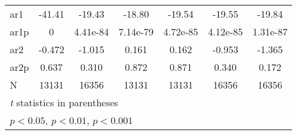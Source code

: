 \begin{table}[htbp]
\begin{tabular}{l*{6}{c}}
ar1                 &      -41.41         &      -19.43         &      -18.80         &      -19.54         &      -19.55         &      -19.84         \\
ar1p                &           0         &    4.41e-84         &    7.14e-79         &    4.72e-85         &    4.12e-85         &    1.31e-87         \\
ar2                 &      -0.472         &      -1.015         &       0.161         &       0.162         &      -0.953         &      -1.365         \\
ar2p                &       0.637         &       0.310         &       0.872         &       0.871         &       0.340         &       0.172         \\
N                   &       13131         &       16356         &       13131         &       13131         &       16356         &       16356         \\
\bottomrule
\multicolumn{7}{l}{\footnotesize \textit{t} statistics in parentheses}\\
\multicolumn{7}{l}{\footnotesize \sym{*} \(p<0.05\), \sym{**} \(p<0.01\), \sym{***} \(p<0.001\)}\\
\end{tabular}
\end{table}
